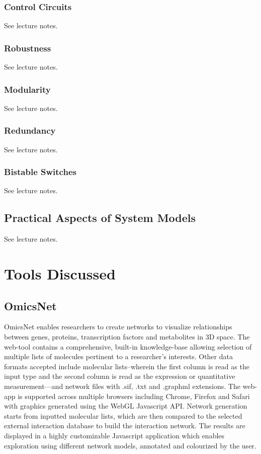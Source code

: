         \subsubsection{Control Circuits}
        See lecture notes.\autocite{T10}

        \subsubsection{Robustness}
        See lecture notes.\autocite{T10}

        \subsubsection{Modularity}
        See lecture notes.\autocite{T10}

        \subsubsection{Redundancy}
        See lecture notes.\autocite{T10}

        \subsubsection{Bistable Switches}
        See lecture notes.\autocite{T10}

    \subsection{Practical Aspects of System Models}
    See lecture notes.\autocite{T10}

\section{Tools Discussed}

    \subsection{OmicsNet}

    OmicsNet enables researchers to create networks to visualize relationships between genes, proteins, transcription factors and metabolites in 3D space.\autocite{B21} The web-tool contains a comprehensive, built-in knowledge-base allowing selection of multiple lists of molecules pertinent to a researcher’s interests.\autocite{B21} Other data formats accepted include molecular lists--wherein the first column is read as the input type and the second column is read as the expression or quantitative measurement---and network files with .sif, .txt and .graphml extensions.\autocite{B21} The web-app is supported across multiple browsers including Chrome, Firefox and Safari with graphics generated using the WebGL Javascript API.\autocite{B21} Network generation starts from inputted molecular lists, which are then compared to the selected external interaction database to build the interaction network.\autocite{B21} The results are displayed in a highly customizable Javascript application which enables exploration using different network models, annotated and colourized by the user.\autocite{B21}

